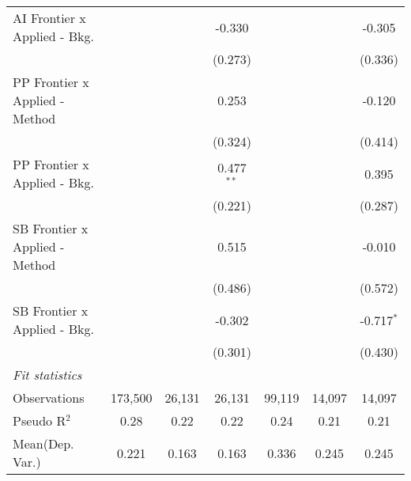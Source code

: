 \begin{tabular}{lcccccc}
   AI Frontier x Applied - Bkg.   &                &               & -0.330        &                &               & -0.305\\   
                                  &                &               & (0.273)       &                &               & (0.336)\\   
   PP Frontier x Applied - Method &                &               & 0.253         &                &               & -0.120\\   
                                  &                &               & (0.324)       &                &               & (0.414)\\   
   PP Frontier x Applied - Bkg.   &                &               & 0.477$^{**}$  &                &               & 0.395\\   
                                  &                &               & (0.221)       &                &               & (0.287)\\   
   SB Frontier x Applied - Method &                &               & 0.515         &                &               & -0.010\\   
                                  &                &               & (0.486)       &                &               & (0.572)\\   
   SB Frontier x Applied - Bkg.   &                &               & -0.302        &                &               & -0.717$^{*}$\\   
                                  &                &               & (0.301)       &                &               & (0.430)\\   
   \midrule
   \emph{Fit statistics}\\
   Observations                   & 173,500        & 26,131        & 26,131        & 99,119         & 14,097        & 14,097\\  
   Pseudo R$^2$                   & 0.28           & 0.22          & 0.22          & 0.24           & 0.21          & 0.21\\  
Mean(Dep. Var.) & 0.221 & 0.163 & 0.163 & 0.336 & 0.245 & 0.245 \\
   

\end{tabular}
